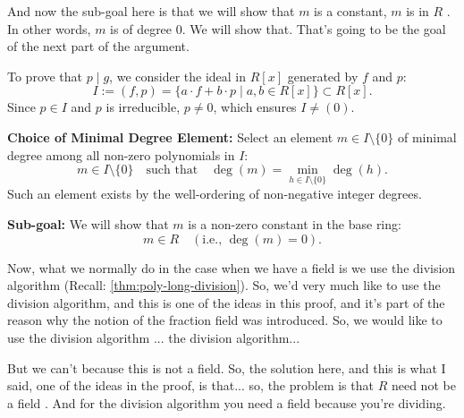 \begin{proofWrapper}
\begin{speech}[00:16:44 - 00:18:50]
And now the sub-goal here is that we will show that $m$ is a constant, $m$ is in $R$ . In other words, $m$ is of degree $0$. We will show that. That's going to be the goal of the next part of the argument.
\end{speech}

\begin{content}
To prove that $p \mid g$, we consider the ideal in $R[x]$ generated by $f$ and $p$:
\begin{equation}\label{eq:ideal-I-def-w7tue}
I := (f, p) = \{ a \cdot f + b \cdot p \mid a, b \in R[x] \} \subset R[x].
\end{equation}
Since $p \in I$ and $p$ is irreducible, $p \neq 0$, which ensures $I \neq (0)$.

\textbf{Choice of Minimal Degree Element:}
Select an element $m \in I \setminus \{0\}$ of minimal degree among all non-zero polynomials in $I$:
\begin{equation}\label{eq:minimal-m-def}
m \in I \setminus \{0\} \quad \text{such that} \quad \deg(m) = \min_{h \in I \setminus \{0\}} \deg(h).
\end{equation}
Such an element exists by the well-ordering of non-negative integer degrees.

\textbf{Sub-goal:} We will show that $m$ is a non-zero constant in the base ring:
\begin{equation}\label{eq:subgoal-m-in-R}
m \in R \quad (\text{i.e., } \deg(m) = 0).
\end{equation}
\end{content}

\begin{speech}[00:18:50 - 00:21:05]
Now, what we normally do in the case when we have a field is we use the division algorithm (Recall: \cref{thm:poly-long-division}). So, we'd very much like to use the division algorithm, and this is one of the ideas in this proof, and it's part of the reason why the notion of the fraction field was introduced. So, we would like to use the division algorithm  ... the division algorithm...

But we can't because this is not a field. So, the solution here, and this is what I said, one of the ideas in the proof, is that... so, the problem is that $R$ need not be a field . And for the division algorithm you need a field because you're dividing.


\end{speech}
\end{proofWrapper}
